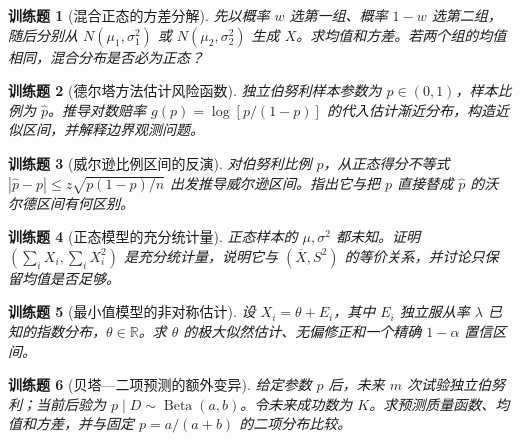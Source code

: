 \documentclass[UTF8,12pt,a4paper,fontset=fandol]{ctexbook}
\newtheorem{exercise}{训练题}[section]
\begin{document}
\begin{exercise}[混合正态的方差分解]\label{q:B17.9}
先以概率 $w$ 选第一组、概率 $1-w$ 选第二组，随后分别从 $N(\mu_1,\sigma_1^2)$ 或 $N(\mu_2,\sigma_2^2)$ 生成 $X$。求均值和方差。若两个组的均值相同，混合分布是否必为正态？\par{}\end{exercise}

\begin{exercise}[德尔塔方法估计风险函数]\label{q:B17.10}
独立伯努利样本参数为 $p\in(0,1)$，样本比例为 $\widehat p$。推导对数赔率 $g(p)=\log[p/(1-p)]$ 的代入估计渐近分布，构造近似区间，并解释边界观测问题。\par{}\end{exercise}

\begin{exercise}[威尔逊比例区间的反演]\label{q:B17.11}
对伯努利比例 $p$，从正态得分不等式 $|\widehat p-p|\le z\sqrt{p(1-p)/n}$ 出发推导威尔逊区间。指出它与把 $p$ 直接替成 $\widehat p$ 的沃尔德区间有何区别。\par{}\end{exercise}

\begin{exercise}[正态模型的充分统计量]\label{q:B17.12}
正态样本的 $\mu,\sigma^2$ 都未知。证明 $(\sum_iX_i,\sum_iX_i^2)$ 是充分统计量，说明它与 $(\overline X,S^2)$ 的等价关系，并讨论只保留均值是否足够。\par{}\end{exercise}

\begin{exercise}[最小值模型的非对称估计]\label{q:B17.13}
设 $X_i=\theta+E_i$，其中 $E_i$ 独立服从率 $\lambda$ 已知的指数分布，$\theta\in\mathbb R$。求 $\theta$ 的极大似然估计、无偏修正和一个精确 $1-\alpha$ 置信区间。\par{}\end{exercise}

\begin{exercise}[贝塔—二项预测的额外变异]\label{q:B17.14}
给定参数 $p$ 后，未来 $m$ 次试验独立伯努利；当前后验为 $p\mid D\sim\operatorname{Beta}(a,b)$。令未来成功数为 $K$。求预测质量函数、均值和方差，并与固定 $p=a/(a+b)$ 的二项分布比较。\par{}\end{exercise}
\end{document}
